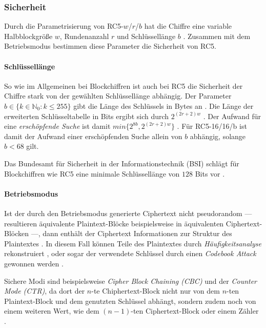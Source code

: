 \documentclass[course=erap]{aspdoc}
\begin{document}
\subsubsection{Sicherheit}
\label{sec:Sicherheit}

Durch die Parametrisierung von RC5-$w$/$r$/$b$ hat die Chiffre eine variable Halbblockgröße $w$, Rundenanzahl $r$ und Schlüssellänge $b$ \cite[p.2]{rc5rev}. Zusammen mit dem Betriebsmodus bestimmen diese Parameter die Sicherheit von RC5.

\paragraph{Schlüssellänge} So wie im Allgemeinen bei Blockchiffren ist auch bei RC5 die Sicherheit der Chiffre stark von der gewählten Schlüssellänge abhängig. Der Parameter $b \in \{k \in \mathbb{N}_0 \colon k \leq 255\}$ gibt die Länge des Schlüssels in Bytes an \cite[p.3]{rc5rev}. Die Länge der erweiterten Schlüsseltabelle in Bits ergibt sich durch $2^{(2r + 2)w}$ \cite[p.2]{rc5rev}. Der Aufwand für eine \textit{erschöpfende Suche} ist damit $min\{2^{8b}, 2^{(2r + 2)w}\}$ \cite[p.29]{kaliski+yin}. Für RC5-16/16/b ist damit der Aufwand einer erschöpfenden Suche allein von $b$ abhängig, solange $b < 68$ gilt.\bigbreak

Das Bundesamt für Sicherheit in der Informationstechnik (BSI) schlägt für Blockchiffren wie RC5 eine minimale Schlüssellänge von $128$ Bits vor \cite[p.21]{bsi}.

\paragraph{Betriebsmodus} Ist der durch den Betriebsmodus generierte Ciphertext nicht pseudorandom --- resultieren äquivalente Plaintext-Blöcke beispielsweise in äquivalenten Ciphertext-Blöcken ---, dann enthält der Ciphertext Informationen zur Struktur des Plaintextes \cite[p.22]{bsi}. In diesem Fall können Teile des Plaintextes durch \textit{Häufigkeitsanalyse} rekonstruiert \cite[p.22]{bsi}, oder sogar der verwendete Schlüssel durch einen \textit{Codebook Attack} gewonnen werden \cite[p.2]{elbaz}.\bigbreak

Sichere Modi sind beispielsweise \textit{Cipher Block Chaining (CBC)} und der \textit{Counter Mode (CTR)}, da dort der $n$-te Chiphertext-Block nicht nur von dem $n$-ten Plaintext-Block und dem genutzten Schlüssel abhängt, sondern zudem noch von einem weiteren Wert, wie dem $(n-1)$-ten Ciphertext-Block oder einem Zähler \cite[p.22]{bsi}.
\end{document}
